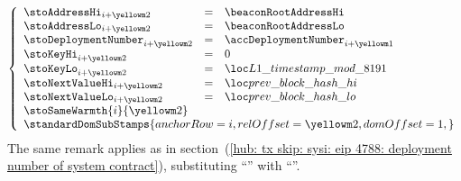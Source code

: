 \item[\underline{Storing the \inst{BLOCKHASH} in the state:}] 
	\[
		\left\{ \begin{array}{lclr}
			\stoAddressHi         _{i + \roffTxSkipSysiBlockHashSystemContractStorage} & = & \beaconRootAddressHi                                                      \\
			\stoAddressLo         _{i + \roffTxSkipSysiBlockHashSystemContractStorage} & = & \beaconRootAddressLo                                                      \\
			\stoDeploymentNumber  _{i + \roffTxSkipSysiBlockHashSystemContractStorage} & = & \accDeploymentNumber _{i + \roffTxSkipSysiBlockHashSystemContractAccount} \\
			\stoKeyHi             _{i + \roffTxSkipSysiBlockHashSystemContractStorage} & = & 0                                                                         \\
			\stoKeyLo             _{i + \roffTxSkipSysiBlockHashSystemContractStorage} & = & \locLayerOneTimeStampModuloPrime                                          \\
			\stoNextValueHi       _{i + \roffTxSkipSysiBlockHashSystemContractStorage} & = & \locPreviousBlockHashHi                                                   \\
			\stoNextValueLo       _{i + \roffTxSkipSysiBlockHashSystemContractStorage} & = & \locPreviousBlockHashLo                                                   \\
			\multicolumn{3}{l}{\stoSameWarmth  {i}{\roffTxSkipSysiBlockHashSystemContractStorage} } \\
			\multicolumn{3}{l}{
				\standardDomSubStamps {
					anchorRow = i                                              ,
					relOffset = \roffTxSkipSysiBlockHashSystemContractStorage ,
					domOffset = 1                                              ,
				}} \\
		\end{array} \right.
	\]
	\saNote{} \label{hub: tx skip: sysi: eip 2935: deployment number of system contract}
	The same remark applies as in
	section~(\ref{hub: tx skip: sysi: eip 4788: deployment number of system contract}),
	substituting
	``\beaconRootAddress''
	with
	``\blockHashAddress''.
